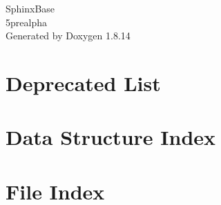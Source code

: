 \documentclass[twoside]{book}
\newcommand{\+}{\discretionary{\mbox{\scriptsize$\hookleftarrow$}}{}{}}
\newcommand{\clearemptydoublepage}{%
  \newpage{\pagestyle{empty}\cleardoublepage}%
}
\begin{document}
\begin{titlepage}
\vspace*{7cm}
\begin{center}%
{\Large Sphinx\+Base \\[1ex]\large 5prealpha }\\
\vspace*{1cm}
{\large Generated by Doxygen 1.8.14}\\
\end{center}
\end{titlepage}
\clearemptydoublepage
{}
\tableofcontents
\clearemptydoublepage
{}

\chapter{Deprecated List}
\label{deprecated}

\chapter{Data Structure Index}

\chapter{File Index}

\end{document}
